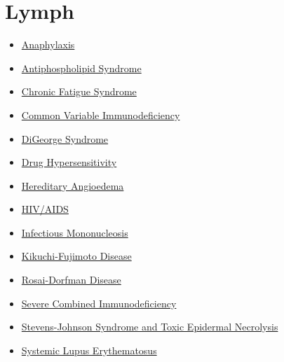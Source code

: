 \section*{Lymph}
\label{sec:organ_lymph}
\begin{itemize}[noitemsep]
  \item \hyperlink{sec:Anaphylaxis}{Anaphylaxis}
  \item \hyperlink{sec:Antiphospholipid Syndrome}{Antiphospholipid Syndrome}
  \item \hyperlink{sec:Chronic Fatigue Syndrome}{Chronic Fatigue Syndrome}
  \item \hyperlink{sec:Common Variable Immunodeficiency}{Common Variable Immunodeficiency}
  \item \hyperlink{sec:DiGeorge Syndrome}{DiGeorge Syndrome}
  \item \hyperlink{sec:Drug Hypersensitivity}{Drug Hypersensitivity}
  \item \hyperlink{sec:Hereditary Angioedema}{Hereditary Angioedema}
  \item \hyperlink{sec:HIV/AIDS}{HIV/AIDS}
  \item \hyperlink{sec:Infectious Mononucleosis}{Infectious Mononucleosis}
  \item \hyperlink{sec:Kikuchi-Fujimoto Disease}{Kikuchi-Fujimoto Disease}
  \item \hyperlink{sec:Rosai-Dorfman Disease}{Rosai-Dorfman Disease}
  \item \hyperlink{sec:Severe Combined Immunodeficiency}{Severe Combined Immunodeficiency}
  \item \hyperlink{sec:Stevens-Johnson Syndrome and Toxic Epidermal Necrolysis}{Stevens-Johnson Syndrome and Toxic Epidermal Necrolysis}
  \item \hyperlink{sec:Systemic Lupus Erythematosus}{Systemic Lupus Erythematosus}
\end{itemize}

